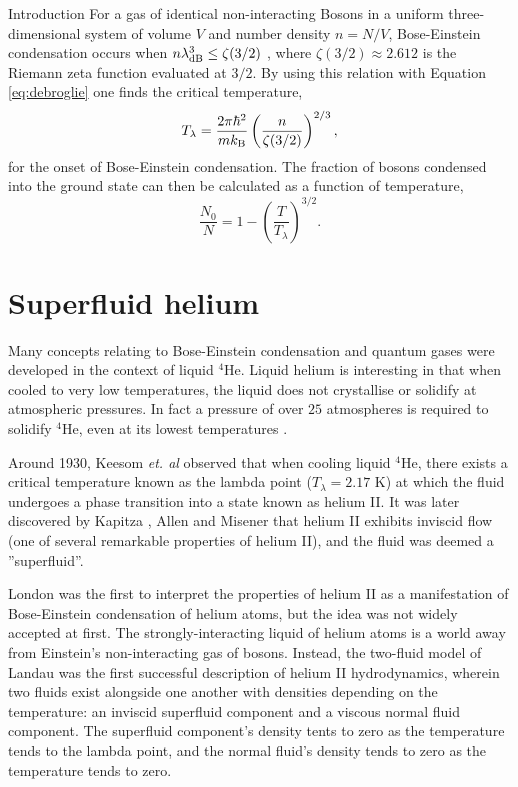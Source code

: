 \begin{chapter}{\label{cha:bose_gases}Introduction}
For a gas of identical non-interacting Bosons in a uniform three-dimensional system of volume $V$ and number density $n=N/V$, Bose-Einstein condensation occurs when $n\lambda_{\rm dB}^3 \leq \zeta(3/2)$ \cite{Pethick,huang1987statistical}, where $\zeta(3/2)\approx2.612$ is the Riemann zeta function evaluated at $3/2$. By using this relation with Equation \ref{eq:debroglie} one finds the critical temperature,
\begin{equation}
T_\lambda = \frac{2\pi\hbar^2}{mk_{\rm B}} \left ( \frac{n}{\zeta(3/2)} \right )^{2/3},
\label{eq:tlambda}
\end{equation}
for the onset of Bose-Einstein condensation. The fraction of bosons condensed into the ground state can then be calculated as a function of temperature,
\begin{equation}
	\frac{N_0}{N} = 1 - \left( \frac{T}{T_\lambda}\right )^{3/2}.
\end{equation}

\section{Superfluid helium}
Many concepts relating to Bose-Einstein condensation and quantum gases were developed in the context of liquid $^4$He. Liquid helium is interesting in that when cooled to very low temperatures, the liquid does not crystallise or solidify at atmospheric pressures. In fact a pressure of over $25$ atmospheres is required to solidify $^4$He, even at its lowest temperatures \cite{Pethick}. 

Around 1930, Keesom {\it et. al} \cite{Keesom27,Keesom35} observed that when cooling liquid $^4$He, there exists a critical temperature known as the lambda point ($T_\lambda = 2.17$ K) at which the fluid undergoes a phase transition into a state known as helium II. It was later discovered by Kapitza \cite{Kapitza}, Allen and Misener \cite{Allen38} that helium II exhibits inviscid flow (one of several remarkable properties of helium II), and the fluid was deemed a ''superfluid''.

London \cite{London38,London38b} was the first to interpret the properties of helium II as a manifestation of Bose-Einstein condensation of helium atoms, but the idea was not widely accepted at first. The strongly-interacting liquid of helium atoms is a world away from Einstein's non-interacting gas of bosons. Instead, the two-fluid model of Landau \cite{Landau41} was the first successful description of helium II hydrodynamics, wherein two fluids exist alongside one another with densities depending on the temperature: an inviscid superfluid component and a viscous normal fluid component. The superfluid component's density tents to zero as the temperature tends to the lambda point, and the normal fluid's density tends to zero as the temperature tends to zero.


\end{chapter}

